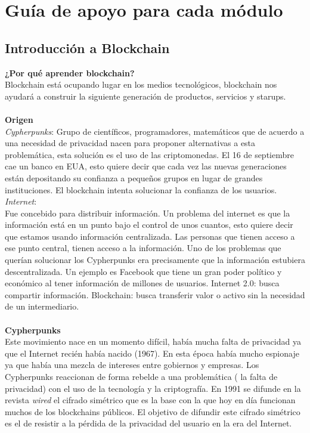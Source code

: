 \documentclass[a4paper,12pt]{lib/pub}
\begin{document}
\section{Guía de apoyo para cada módulo}
\subsection{Introducción a Blockchain}
\textbf{¿Por qué aprender blockchain?}\\
Blockchain está ocupando lugar en los medios tecnológicos, blockchain nos ayudará a construir la siguiente generación de productos, servicios y starups.\\\\
\textbf{Origen}\\
\textit{Cypherpunks}: Grupo de científicos, programadores, matemáticos que de acuerdo a una necesidad de privacidad nacen para proponer alternativas a esta problemática, esta solución es el uso de las criptomonedas. El 16 de septiembre cae un banco en EUA, esto quiere decir que cada vez las nuevas generaciones están depositando su confianza a pequeños grupos en lugar de grandes instituciones. El blockchain intenta solucionar la confianza de los usuarios.
\textit{Internet}:\\
Fue concebido para distribuir información. Un problema del internet es que la información está en un punto bajo el control de unos cuantos, esto quiere decir que estamos usando información centralizada. Las personas que tienen acceso a ese punto central, tienen acceso a la información. Uno de los problemas que querían solucionar los Cypherpunks era precisamente que la información estubiera descentralizada. Un ejemplo es Facebook que tiene un gran poder político y económico al tener información de millones de usuarios.
Internet 2.0: busca compartir información.
Blockchain: busca transferir valor o activo sin la necesidad de un intermediario.\\\\
\textbf{Cypherpunks}\\
Este movimiento nace en un momento difícil, había mucha falta de privacidad ya que el Internet recién había nacido (1967). En esta época había mucho espionaje ya que había una mezcla de intereses entre gobiernos y empresas.
Los Cypherpunks reaccionan de forma rebelde a una problemática ( la falta de privacidad) con el uso de la tecnología y la criptografía.
En 1991 se difunde en la revista \textit{wired} el cifrado simétrico que es la base con la que hoy en día funcionan muchos de los blockchains públicos. El objetivo de difundir este cifrado simétrico es el de resistir a la pérdida de la privacidad del usuario en la era del Internet.\newpage
\end{document}
